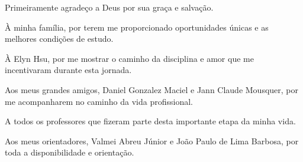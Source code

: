 \begin{agradecimentos}[AGRADECIMENTOS]
Primeiramente agradeço a Deus por sua graça e salvação.

À minha família, por terem me proporcionado oportunidades únicas e as melhores condições de estudo.

À Elyn Hsu, por me mostrar o caminho da disciplina e amor que me incentivaram durante esta jornada.

Aos meus grandes amigos, Daniel Gonzalez Maciel e Jann Claude Mousquer, por me acompanharem no caminho da vida profissional.

A todos os professores que fizeram parte desta importante etapa da minha vida.

Aos meus orientadores, Valmei Abreu Júnior e João Paulo de Lima Barbosa, por toda a disponibilidade e orientação.


\end{agradecimentos}

